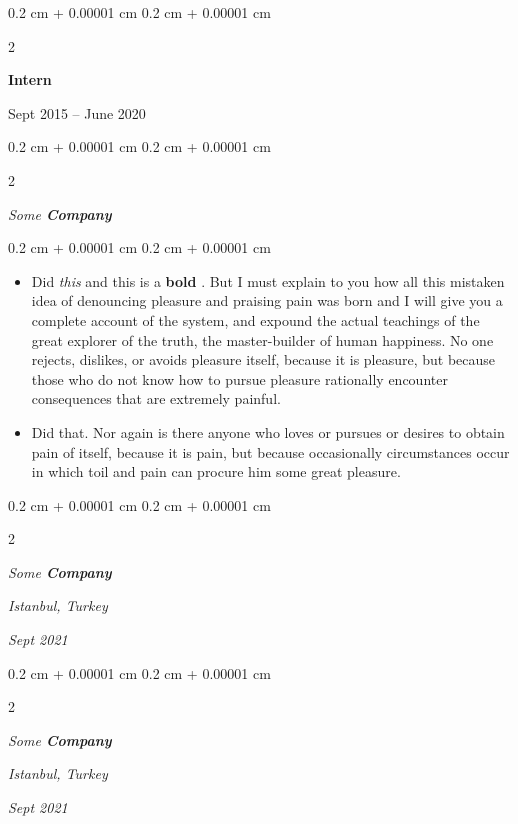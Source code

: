 \documentclass[10pt, letterpaper]{article}
\newenvironment{highlights}{
    \begin{itemize}[
        topsep=0.10 cm,
        parsep=0.10 cm,
        partopsep=0pt,
        itemsep=0pt,
        leftmargin=0.4 cm + 10pt
    ]
}{
    \end{itemize}
} %
\newenvironment{onecolentry}{
    \begin{adjustwidth}{
        0.2 cm + 0.00001 cm
    }{
        0.2 cm + 0.00001 cm
    }
}{
    \end{adjustwidth}
} %
\newenvironment{twocolentry}[2][]{
    \onecolentry
    \def\secondColumn{#2}
    \setcolumnwidth{\fill, 4.5 cm}
    \begin{paracol}{2}
}{
    \switchcolumn \raggedleft \secondColumn
    \end{paracol}
    \endonecolentry
} %
\let\hrefWithoutArrow\href
\renewcommand{\href}[2]{\hrefWithoutArrow{#1}{\ifthenelse{\equal{#2}{}}{ }{#2 }\raisebox{.15ex}{\footnotesize \faExternalLink*}}}
\begin{document}
        \vspace{0.2 cm}

                \begin{twocolentry}{
                    Sept 2015 – June 2020
                }
                \textbf{Intern}
                \end{twocolentry}
            \begin{twocolentry}{
            }
            \textit{Some \textbf{Company}}
            \end{twocolentry}

        \vspace{0.10 cm}
        \begin{onecolentry}
            \begin{highlights}
                \item Did \textit{this} and this is a \textbf{bold} \href{https://example.com}{link}. But I must explain to you how all this mistaken idea of denouncing pleasure and praising pain was born and I will give you a complete account of the system, and expound the actual teachings of the great explorer of the truth, the master-builder of human happiness. No one rejects, dislikes, or avoids pleasure itself, because it is pleasure, but because those who do not know how to pursue pleasure rationally encounter consequences that are extremely painful.
                \item Did that. Nor again is there anyone who loves or pursues or desires to obtain pain of itself, because it is pain, but because occasionally circumstances occur in which toil and pain can procure him some great pleasure.
            \end{highlights}
        \end{onecolentry}


        \vspace{0.2 cm}

            \begin{twocolentry}{
        \textit{Istanbul, Turkey}

        \textit{Sept 2021}    }
                \textbf{}

                \textit{Some \textbf{Company}}
            \end{twocolentry}



        \vspace{0.2 cm}

            \begin{twocolentry}{
        \textit{Istanbul, Turkey}

        \textit{Sept 2021}    }
                \textbf{}

                \textit{Some \textbf{Company}}
            \end{twocolentry}
\end{document}
